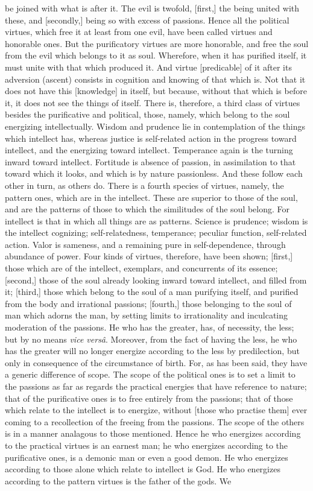 \documentclass[12pt]{article}
\begin{document}
be joined with what is after it. The evil is twofold, [first,] the being united with these, and [secondly,] being so with excess of passions. Hence all the political virtues, which free it at least from one evil, have been called virtues and honorable ones. But the purificatory virtues are more honorable, and free the soul from the evil which belongs to it as soul. Wherefore, when it has purified itself, it must unite with that which produced it. And virtue [predicable] of it after its adversion (ascent) consists in cognition and knowing of that which is. Not that it does not have this [knowledge] in itself, but because, without that which is before it, it does not see the things of itself. There is, therefore, a third class of virtues besides the purificative and political, those, namely, which belong to the soul energizing intellectually. Wisdom and prudence lie in contemplation of the things which intellect has, whereas justice is self-related action in the progress toward intellect, and the energizing toward intellect. Temperance again is the turning inward toward intellect. Fortitude is absence of passion, in assimilation to that toward which it looks, and which is by nature passionless. And these follow each other in turn, as others do. There is a fourth species of virtues, namely, the pattern ones, which are in the intellect. These are superior to those of the soul, and are the patterns of those to which the similitudes of the soul belong. For intellect is that in which all things are as patterns. Science is prudence; wisdom is the intellect cognizing; self-relatedness, temperance; peculiar function, self-related action. Valor is sameness, and a remaining pure in self-dependence, through abundance of power. Four kinds of virtues, therefore, have been shown; [first,] those which are of the intellect, exemplars, and concurrents of its essence; [second,] those of the soul already looking inward toward intellect, and filled from it; [third,] those which belong to the soul of a man purifying itself, and purified from the body and irrational passions; [fourth,] those belonging to the soul of man which adorns the man, by setting limits to irrationality and inculcating moderation of the passions. He who has the greater, has, of necessity, the less; but by no means \textit{vice vers\^{a}}. Moreover, from the fact of having the less, he who has the greater will no longer energize according to the less by predilection, but only in consequence of the circumstance of birth. For, as has been said, they have a generic difference of scope. The scope of the political ones is to set a limit to the passions as far as regards the practical energies that have reference to nature; that of the purificative ones is to free entirely from the passions; that of those which relate to the intellect is to energize, without [those who practise them] ever coming to a recollection of the freeing from the passions. The scope of the others is in a manner analagous to those mentioned. Hence he who energizes according to the practical virtues is an earnest man; he who energizes according to the purificative ones, is a demonic man or even a good demon. He who energizes according to those alone which relate to intellect is God. He who energizes according to the pattern virtues is the father of the gods. We 
\end{document}
